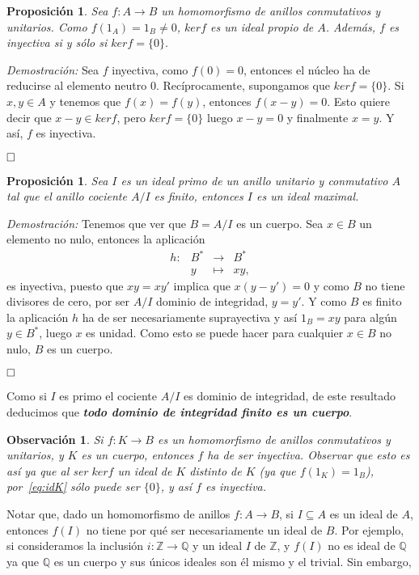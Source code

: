 \documentclass[12pt]{article}
\newtheorem{proposition}[theorem]{Proposición}
\newtheorem{observation}{Observación}[theorem]
\begin{document}
\begin{proposition} Sea $f \colon A \longrightarrow B$ un homomorfismo de anillos conmutativos y unitarios. Como $f(1_{A}) = 1_{B} \neq 0$, $ker f$ es un ideal propio de $A$. Además, $f$ es inyectiva si y sólo si $ker f = \lbrace 0 \rbrace.$
\end{proposition}
\emph{Demostración: } Sea $f$ inyectiva, como $f(0) = 0$, entonces el núcleo ha de reducirse al elemento neutro $0$. Recíprocamente, supongamos que $ker f = \lbrace 0 \rbrace$. Si $x,y \in A$ y tenemos que $f(x) = f(y)$, entonces $f(x-y)= 0$. Esto quiere decir que $x-y \in ker f$, pero $ker f = \lbrace 0 \rbrace$ luego $x-y = 0$ y finalmente $x = y$. Y así, $f$ es inyectiva.

$\hfill \square$

\begin{proposition} Sea $I$ es un ideal primo de un anillo unitario y conmutativo $A$ tal que el anillo cociente $A/I$ es finito, entonces $I$ es un ideal maximal.
\end{proposition}
\emph{Demostración: } Tenemos que ver que $ B = A/I$ es un cuerpo. Sea $x \in B$ un elemento no nulo, entonces la aplicación $$\begin{array}{rccl}
h \colon &B^{\ast}&\longrightarrow &B^{\ast} \\
&y& \longmapsto &xy,
\end{array}
$$ es inyectiva, puesto que $xy = xy'$ implica que $x(y-y') =0$ y como $B$ no tiene divisores de cero, por ser $A/I$ dominio de integridad, $y = y'$. Y como $B$ es finito la aplicación $h$ ha de ser necesariamente suprayectiva y así $1_{B} = xy$ para algún $y \in B^{\ast}$, luego $x$ es unidad. Como esto se puede hacer para cualquier $x \in B$ no nulo, $B$ es un cuerpo.

$\hfill \square$

Como si $I$ es primo el cociente $A/I$ es dominio de integridad, de este resultado deducimos que \textbf{\textit{todo dominio de integridad finito es un cuerpo}}.

\begin{observation} Si $f \colon K \longrightarrow B$ es un homomorfismo de anillos conmutativos y unitarios, y $K$ es un cuerpo, entonces $f$ ha de ser inyectiva. Observar que esto es así ya que al ser $ker f$ un ideal de $K$ distinto de $K$ (ya que $f(1_{K}) = 1_{B}$), por~\ref{eq:idK} sólo puede ser $\lbrace 0 \rbrace$, y así $f$ es inyectiva.
\end{observation}

Notar que, dado un homomorfismo de anillos $f \colon A \longrightarrow B$, si $I \subseteq A$ es un ideal de $A$, entonces $f(I)$ no tiene por qué ser necesariamente un ideal de $B$. Por ejemplo, si consideramos la inclusión $i \colon \mathbb{Z} \longrightarrow \mathbb{Q}$ y un ideal $I$ de $\mathbb{Z}$, y $f(I)$ no es ideal de $\mathbb{Q}$ ya que $\mathbb{Q}$ es un cuerpo y sus únicos ideales son él mismo y el trivial. Sin embargo, 
\end{document}
